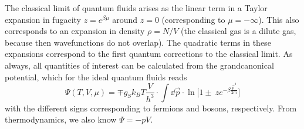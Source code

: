 The classical limit of quantum fluids arises as the 
linear term in a Taylor expansion in fugacity 
$z=e^{\beta\mu}$ around $z=0$ (corresponding to $\mu=-\infty$). 
This also corresponds to an expansion in density $\rho=N/V$
(the classical gas is a dilute gas, because then wavefunctions 
do not overlap). The quadratic terms in these expansions 
correspond to the first quantum corrections to the classical 
limit. As always, all quantities of interest can be calculated 
from the grandcanonical potential, which for the ideal quantum
fluids reads
\begin{equation}
    \Psi(T,V,\mu)=\mp g_Sk_BT\frac{V}{h^3}\cdot
    \int\dd\vec p\cdot\ln\bigg[
        1\pm\ ze^{-\beta\frac{\vec p^2}{2m}}
    \bigg]
    \label{eq:ideal_quantum_fluid}
\end{equation}
with the different signs corresponding to fermions and bosons, 
respectively. From thermodynamics, we also know $\Psi=-pV$.

